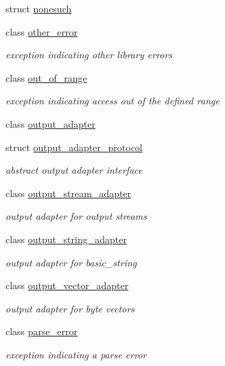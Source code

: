 \begin{DoxyCompactItemize}
\item 
struct \mbox{\hyperlink{structnlohmann_1_1detail_1_1nonesuch}{nonesuch}}
\item 
class \mbox{\hyperlink{classnlohmann_1_1detail_1_1other__error}{other\+\_\+error}}
\begin{DoxyCompactList}\small\item\em exception indicating other library errors \end{DoxyCompactList}\item 
class \mbox{\hyperlink{classnlohmann_1_1detail_1_1out__of__range}{out\+\_\+of\+\_\+range}}
\begin{DoxyCompactList}\small\item\em exception indicating access out of the defined range \end{DoxyCompactList}\item 
class \mbox{\hyperlink{classnlohmann_1_1detail_1_1output__adapter}{output\+\_\+adapter}}
\item 
struct \mbox{\hyperlink{structnlohmann_1_1detail_1_1output__adapter__protocol}{output\+\_\+adapter\+\_\+protocol}}
\begin{DoxyCompactList}\small\item\em abstract output adapter interface \end{DoxyCompactList}\item 
class \mbox{\hyperlink{classnlohmann_1_1detail_1_1output__stream__adapter}{output\+\_\+stream\+\_\+adapter}}
\begin{DoxyCompactList}\small\item\em output adapter for output streams \end{DoxyCompactList}\item 
class \mbox{\hyperlink{classnlohmann_1_1detail_1_1output__string__adapter}{output\+\_\+string\+\_\+adapter}}
\begin{DoxyCompactList}\small\item\em output adapter for basic\+\_\+string \end{DoxyCompactList}\item 
class \mbox{\hyperlink{classnlohmann_1_1detail_1_1output__vector__adapter}{output\+\_\+vector\+\_\+adapter}}
\begin{DoxyCompactList}\small\item\em output adapter for byte vectors \end{DoxyCompactList}\item 
class \mbox{\hyperlink{classnlohmann_1_1detail_1_1parse__error}{parse\+\_\+error}}
\begin{DoxyCompactList}\small\item\em exception indicating a parse error \end{DoxyCompactList}\item 

\end{DoxyCompactItemize}

